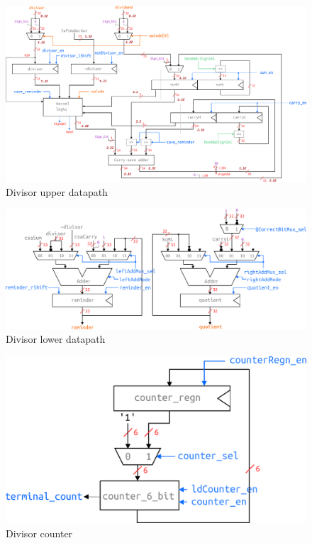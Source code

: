 \begin{figure}[H]
    \centering
    \includegraphics[angle=90,scale=0.9]{pics/divisorKernelLogic.png}
    \caption{Divisor upper datapath}
    \label{fig:my_label}
\end{figure}
\begin{figure}[H]
\includegraphics[scale=0.85]{pics/divisorOutputAdders.png}
    \caption{Divisor lower datapath}
    \label{fig:my_label}
\end{figure}
\begin{figure}[H]
\centering
\includegraphics[scale=0.85]{pics/divisorCounter.png}
    \caption{Divisor counter}
    \label{fig:my_label}
\end{figure}
